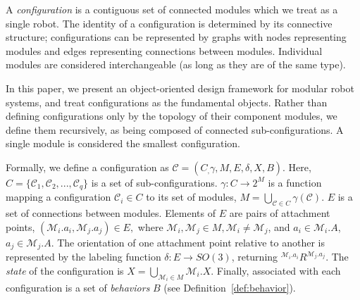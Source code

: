\documentclass[graybox]{svmult}
\begin{document}
\begin{definition}[Configuration]
\label{def:configuration}
A \textit{configuration} is a contiguous set of connected modules which we treat as a
single robot.  The identity of a configuration is determined by its connective structure; configurations
can be represented by graphs with nodes representing modules and edges
representing connections between modules.   Individual modules
are considered interchangeable (as long as they are of the same type).

In this paper, we present an object-oriented design framework for modular robot
systems, and treat configurations as the fundamental objects. Rather than defining
configurations only by the topology of their component modules, we define them recursively,
as being composed of connected sub-configurations. A single module is considered the
smallest configuration.

Formally, we define a configuration as $\mathcal{C}=(C_, \gamma, M, E, \delta,
X, B)$.
%
Here, $C=\{\mathcal{C}_{1}, \mathcal{C}_{2}, ..., \mathcal{C}_{q}\}$ is a set of sub-configurations.
%
$\gamma: C \rightarrow 2^M$ is a function {mapping} a configuration \( \mathcal{C}_i \in C\) to its set of modules,  \( M=\bigcup_{\mathcal{C}\in C}{\gamma(\mathcal{C})} \).
%
$E$ is a set of connections between modules. Elements of \(E\) are pairs of
attachment points, $(\mathcal{M}_i.a_i, \mathcal{M}_j.a_j)\in E,$ where $\mathcal{M}_{i},\mathcal{M}_j \in M, \mathcal{M}_i \neq \mathcal{M}_j$, and $a_i\in \mathcal{M}_i.A$, $a_j\in \mathcal{M}_j.A$.
%
The orientation of one attachment point relative to another is represented by the
labeling function $\delta: E \rightarrow SO(3)$, returning \({^{\mathcal{M}_i.a_i}}R^{\mathcal{M}_j.a_j}\).
%
The \textit{state} of the configuration is \(X = \bigcup_{\mathcal{M}_i \in M} \mathcal{M}_i.X \).
%
Finally, associated with each configuration is a set of \textit{behaviors} \(B\)
(see Definition~\ref{def:behavior}).


\end{definition}
\end{document}
